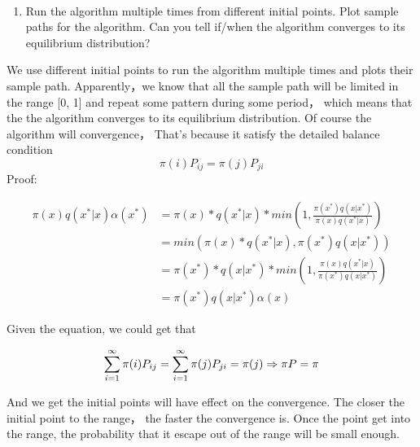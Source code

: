 \documentclass[11pt]{article}
\providecommand{\tightlist}{%
      \setlength{\itemsep}{0pt}\setlength{\parskip}{0pt}}
\begin{document}
    \begin{center}
    \end{center}
    { \hspace*{\fill} \\}
    
    \begin{enumerate}
\def\labelenumi{\roman{enumi}.}
\setcounter{enumi}{1}
\tightlist
\item
  Run the algorithm multiple times from different initial points. Plot
  sample paths for the algorithm. Can you tell if/when the algorithm
  converges to its equilibrium distribution?
\end{enumerate}

We use different initial points to run the algorithm multiple times and
plots their sample path. Apparently，we know that all the sample path
will be limited in the range {[}0, 1{]} and repeat some pattern during
some period， which means that the the algorithm converges to its
equilibrium distribution. Of course the algorithm will convergence，
That's because it satisfy the detailed balance condition
\[\pi(i)P_{ij} = \pi(j)P_{ji}\] Proof:

\begin{align}
\pi(x)q(x^{*}|x)\alpha(x^{*}) &= \pi(x) * q(x^{*}|x) * min(1, \frac{\pi(x^*)q(x|x^{*})}{\pi(x)q(x^{*}|x)})\\
&= min(\pi(x) * q(x^{*}|x), \pi(x^*)q(x|x^{*}))\\
&= \pi(x^*) * q(x|x^*) * min(1, \frac{\pi(x)q(x^*|x)}{\pi(x^*)q(x|x^*)})\\
&= \pi(x^*)q(x|x^*)\alpha(x)
\end{align}

Given the equation, we could get that

\begin{equation}
\sum_{i=1}^{\infty}\pi(i)P_{ij} = \sum_{i=1}^{\infty}\pi(j)P_{ji} = \pi(j)\\
\Rightarrow \pi P = \pi
\end{equation}

And we get the initial points will have effect on the convergence. The
closer the initial point to the range， the faster the convergence is.
Once the point get into the range, the probability that it escape out of
the range will be small enough.
\end{document}
